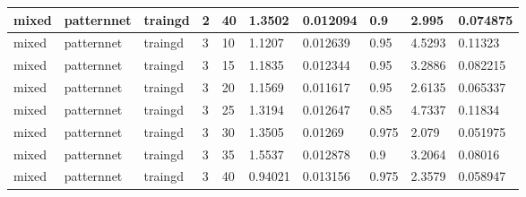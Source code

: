 \begin{longtable}{lllllllll}
mixed & patternnet & traingd & 2 & 40 & 1.3502 & 0.012094 & 0.9 & 2.995 & 0.074875 \\ \hline 
mixed & patternnet & traingd & 3 & 10 & 1.1207 & 0.012639 & 0.95 & 4.5293 & 0.11323 \\ \hline 
mixed & patternnet & traingd & 3 & 15 & 1.1835 & 0.012344 & 0.95 & 3.2886 & 0.082215 \\ \hline 
mixed & patternnet & traingd & 3 & 20 & 1.1569 & 0.011617 & 0.95 & 2.6135 & 0.065337 \\ \hline 
mixed & patternnet & traingd & 3 & 25 & 1.3194 & 0.012647 & 0.85 & 4.7337 & 0.11834 \\ \hline 
mixed & patternnet & traingd & 3 & 30 & 1.3505 & 0.01269 & 0.975 & 2.079 & 0.051975 \\ \hline 
mixed & patternnet & traingd & 3 & 35 & 1.5537 & 0.012878 & 0.9 & 3.2064 & 0.08016 \\ \hline 
mixed & patternnet & traingd & 3 & 40 & 0.94021 & 0.013156 & 0.975 & 2.3579 & 0.058947 \\ \hline 
\end{longtable}